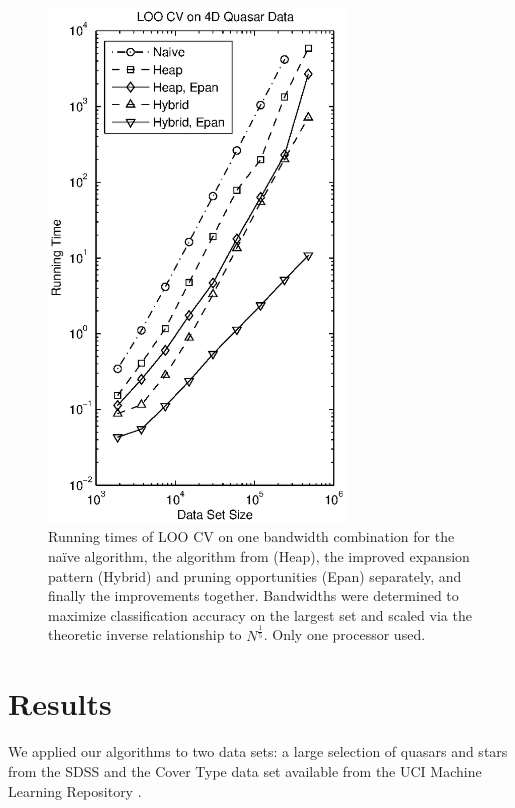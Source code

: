 \documentclass[twoside,leqno,twocolumn]{article}
\begin{document}
\vspace*{0pt}
\newpage

\begin{figure}[tb]
  \vspace{-10pt}
  \begin{center}
    \includegraphics[width=3.1in]{quasar_times_narrow.eps}
  \end{center}
  \vspace{-30pt}
  \caption{\label{fig:quasar-speed}\footnotesize Running times of LOO
    CV on one bandwidth combination for the na\"{i}ve algorithm, the
    algorithm from \cite{nbc-compstat} (Heap), the improved expansion
    pattern (Hybrid) and pruning opportunities (Epan) separately, and
    finally the improvements together.  Bandwidths were determined to
    maximize classification accuracy on the largest set and scaled via
    the theoretic inverse relationship to $N^{\frac{1}{5}}$.  Only one
    processor used.}
\end{figure}

\section{Results}\label{sec:res}
We applied our algorithms to two data sets: a large selection of
quasars and stars from the SDSS and the Cover Type data set available
from the UCI Machine Learning Repository \cite{uci-rep}.
\end{document}
